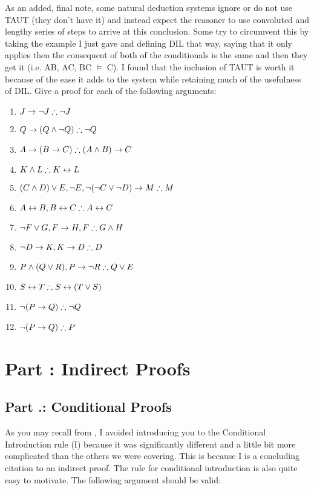 As an added, final note, some natural deduction systems ignore or do not use TAUT (they don't have it) and instead expect the reasoner to use convoluted and lengthy series of steps to arrive at this conclusion. Some try to circumvent this by taking the example I just gave and defining DIL that way, saying that it only applies then the consequent of both of the conditionals is the same and then they get it (i.e. A\eor B, A\eif C, B\eif C $\vDash$ C). I found that the inclusion of TAUT is worth it because of the ease it adds to the system while retaining much of the usefulness of DIL.
\practiceproblems
\problempart
\label{pr.solvedTFLproofs}
Give a proof for each of the following arguments:
\begin{enumerate}
\item $J\eif\enot J \therefore \enot J$
\item $Q\eif(Q\eand\enot Q) \therefore \enot Q$
\item $A\eif (B\eif C) \therefore (A\eand B)\eif C$
\item $K\eand L \therefore K\eiff L$
\item $(C\eand D)\eor E, \enot E, \enot(\enot C\eor \enot D)\eif M \therefore M$
\item $A\eiff B, B\eiff C \therefore A\eiff C$
\item $\enot F\eor G, F\eif H, F \therefore G\eand H$
\item $\enot D\eif K, K \eif D \therefore D$
\item $P \eand (Q\eor R), P\eif \enot R \therefore Q\eor E$
\item $S\eiff T \therefore S\eiff (T\eor S)$
\item $\enot (P \eif Q) \therefore \enot Q$
\item $\enot (P \eif Q) \therefore P$
\end{enumerate}


\setcounter{seccount}{1}
\chapter{Part \thechapcount: Indirect Proofs}
\section{Part \thechapcount.\theseccount: Conditional Proofs}
As you may recall from , I avoided introducing you to the Conditional Introduction rule (\eif I) because it was significantly different and a little bit more complicated than the others we were covering. This is because \eif I is a concluding citation to an indirect proof. The rule for conditional introduction is also quite easy to motivate. The following argument should be valid:

